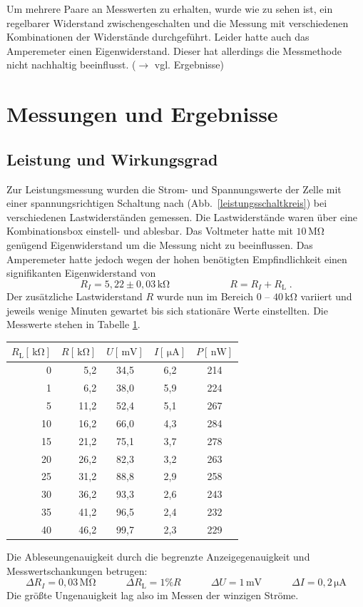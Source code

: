 \documentclass[11pt]{scrartcl}
\newcommand{\unit}[1]{\ensuremath{\,\mathrm{#1}}} %
\begin{document}
Um mehrere Paare an Messwerten zu erhalten, wurde wie zu sehen ist, ein regelbarer Widerstand zwischengeschalten und die Messung mit verschiedenen Kombinationen der Widerst\"ande durchgef\"uhrt. Leider hatte auch das Amperemeter einen Eigenwiderstand. Dieser hat allerdings die Messmethode nicht nachhaltig beeinflusst. ($\rightarrow$ vgl. Ergebnisse) %





\section{Messungen und Ergebnisse}
\subsection{Leistung und Wirkungsgrad}
Zur Leistungsmessung wurden die Strom- und Spannungswerte der Zelle mit einer spannungsrichtigen Schaltung nach (Abb.~\ref{leistungsschaltkreis}) bei verschiedenen Lastwiderständen gemessen. Die Lastwiderstände waren über eine Kombinationsbox einstell- und ablesbar. Das Voltmeter hatte mit $10\unit{M\Omega}$ genügend Eigenwiderstand um die Messung nicht zu beeinflussen. Das Amperemeter hatte jedoch wegen der hohen benötigten Empfindlichkeit einen signifikanten Eigenwiderstand von
\[
R_I = 5,22\pm 0,03 \unit{k\Omega}
\qquad\qquad\qquad
R = R_I+R_{\text{L}}\;.
\]
Der zusätzliche Lastwiderstand $R$ wurde nun im Bereich 0 -- $40\unit{k\Omega}$ variiert und jeweils wenige Minuten gewartet bis sich stationäre Werte einstellten. Die Messwerte stehen in Tabelle \ref{leistungsmesstabelle}.
\begin{table}[ht]
\begin{center}
\begin{tabular}{rr|ccc}
$R_{\text{L}}[\unit{k\Omega}]$ &
$R [\unit{k\Omega}]$ &
$U [\unit{mV}]$ &
$I [\unit{\mu A}]$ &
$P [\unit{nW}]$ \\
\hline
0	& 5,2	& 34,5	& 6,2	& 214 \\
1	& 6,2	& 38,0	& 5,9	& 224 \\
5	& 11,2	& 52,4	& 5,1	& 267 \\
10	& 16,2	& 66,0	& 4,3	& 284 \\
15	& 21,2	& 75,1	& 3,7	& 278 \\
20	& 26,2	& 82,3	& 3,2	& 263 \\
25	& 31,2	& 88,8	& 2,9	& 258 \\
30	& 36,2	& 93,3	& 2,6	& 243 \\
35	& 41,2	& 96,5	& 2,4	& 232 \\
40	& 46,2	& 99,7	& 2,3	& 229
\end{tabular}
\end{center}
\label{leistungsmesstabelle}
\end{table}
Die Ableseungenauigkeit durch die begrenzte Anzeigegenauigkeit und Messwertschankungen betrugen:
\[
\Delta R_I = 0,03\unit{M\Omega}
\qquad\quad
\Delta R_{\text{L}} = 1\% R
\qquad\quad
\Delta U = 1\unit{mV}
\qquad\quad
\Delta I = 0,2\unit{\mu A}
\]
Die größte Ungenauigkeit lag also im Messen der winzigen Ströme.
\end{document}
